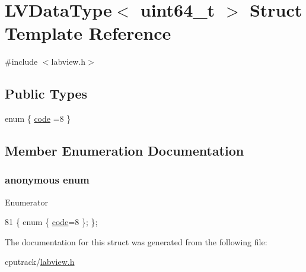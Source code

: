 \hypertarget{struct_l_v_data_type_3_01uint64__t_01_4}{}\section{L\+V\+Data\+Type$<$ uint64\+\_\+t $>$ Struct Template Reference}
\label{struct_l_v_data_type_3_01uint64__t_01_4}


{\ttfamily \#include $<$labview.\+h$>$}

\subsection*{Public Types}
\begin{DoxyCompactItemize}
\item 
enum \{ \hyperlink{struct_l_v_data_type_3_01uint64__t_01_4_a1353d7cf9819c2f8565da7f750ce565ba06809d202e7f9f69e99a07ecf4afae75}{code} =8
 \}
\end{DoxyCompactItemize}


\subsection{Member Enumeration Documentation}
\subsubsection[{\texorpdfstring{anonymous enum}{anonymous enum}}]{\setlength{\rightskip}{0pt plus 5cm}anonymous enum}\hypertarget{struct_l_v_data_type_3_01uint64__t_01_4_a1353d7cf9819c2f8565da7f750ce565b}{}\label{struct_l_v_data_type_3_01uint64__t_01_4_a1353d7cf9819c2f8565da7f750ce565b}
\begin{Desc}
\item[Enumerator]\par
\begin{description}
\item[{\em 
code\hypertarget{struct_l_v_data_type_3_01uint64__t_01_4_a1353d7cf9819c2f8565da7f750ce565ba06809d202e7f9f69e99a07ecf4afae75}{}\label{struct_l_v_data_type_3_01uint64__t_01_4_a1353d7cf9819c2f8565da7f750ce565ba06809d202e7f9f69e99a07ecf4afae75}
}]\end{description}
\end{Desc}

\begin{DoxyCode}
81 \{ \textcolor{keyword}{enum} \{ \hyperlink{struct_l_v_data_type_3_01uint64__t_01_4_a1353d7cf9819c2f8565da7f750ce565ba06809d202e7f9f69e99a07ecf4afae75}{code}=8 \}; \};
\end{DoxyCode}


The documentation for this struct was generated from the following file\+:\begin{DoxyCompactItemize}
\item 
cputrack/\hyperlink{labview_8h}{labview.\+h}\end{DoxyCompactItemize}
